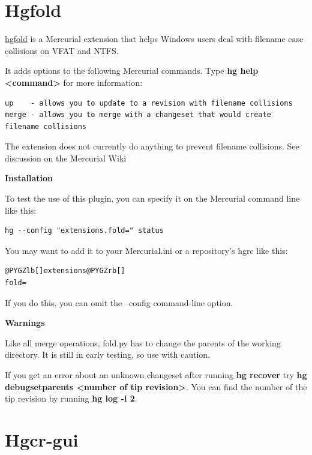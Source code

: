 \documentclass[letterpaper,10pt,english]{manual}
\begin{document}
\section{Hgfold}

\href{http://mercurial.selenic.com/wiki/CaseFoldExtension}{hgfold} is a
Mercurial extension that helps Windows users deal with filename case
collisions on VFAT and NTFS.

It adds options to the following Mercurial commands. Type
\textbf{hg help \textless{}command\textgreater{}} for more information:

\begin{Verbatim}[commandchars=@\[\]]
up    - allows you to update to a revision with filename collisions
merge - allows you to merge with a changeset that would create filename collisions
\end{Verbatim}

The extension does not currently do anything to prevent filename
collisions. See discussion on the Mercurial Wiki

\textbf{Installation}

To test the use of this plugin, you can specify it on the Mercurial
command line like this:

\begin{Verbatim}[commandchars=@\[\]]
hg --config "extensions.fold=" status
\end{Verbatim}

You may want to add it to your Mercurial.ini or a repository's hgrc like this:

\begin{Verbatim}[commandchars=@\[\]]
@PYGZlb[]extensions@PYGZrb[]
fold=
\end{Verbatim}

If you do this, you can omit the --config command-line option.

\textbf{Warnings}

Like all merge operations, fold.py has to change the parents of the
working directory. It is still in early testing, so use with caution.

If you get an error about an unknown changeset after running
\textbf{hg recover} try
\textbf{hg debugsetparents \textless{}number of tip revision\textgreater{}}.
You can find the number of the tip revision by running \textbf{hg log -l 2}.


\section{Hgcr-gui}
\end{document}
